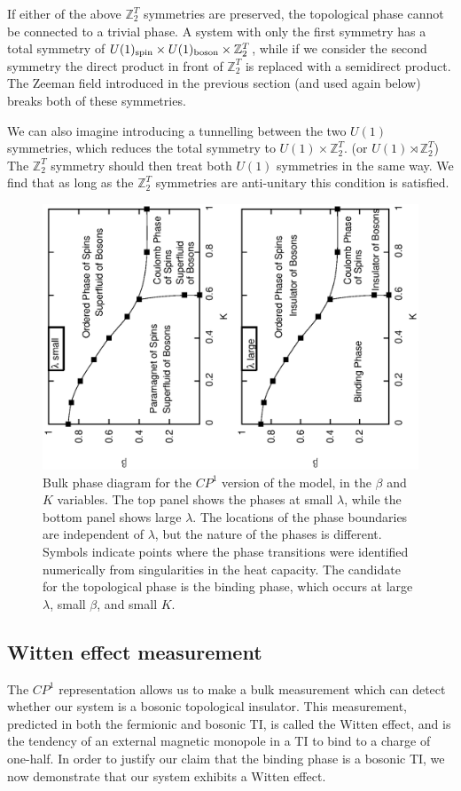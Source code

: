 \documentclass[prb,twocolumn]{revtex4-1}
\def\ztwot{\mathbb{Z}_2^T}
\newcommand{\cp}{$CP^1$ }
\begin{document}
If either of the above $\ztwot$ symmetries are preserved, the topological phase cannot be connected to a trivial phase. A system with only the first symmetry has a total symmetry of $U(1)_{\rm spin}\times U(1)_{\rm boson}\times \ztwot$, while if we consider the second symmetry the direct product in front of $\ztwot$ is replaced with a semidirect product. The Zeeman field introduced in the previous section (and used again below) breaks both of these symmetries.

We can also imagine introducing a tunnelling between the two $U(1)$ symmetries, which reduces the total symmetry to $U(1)\times\ztwot$. (or $U(1)\rtimes\ztwot$) The $\ztwot$ symmetry should then treat both $U(1)$ symmetries in the same way. We find that as long as the $\ztwot$ symmetries are anti-unitary this condition is satisfied.

\begin{figure}
\includegraphics[angle=-90,width=0.9\linewidth]{figures/cp1bulkphase.eps}
\caption{Bulk phase diagram for the $CP^1$ version of the model, in the $\beta$ and $K$ variables. The top panel shows the phases at small $\lambda$, while the bottom panel shows large $\lambda$. The locations of the phase boundaries are independent of $\lambda$, but the nature of the phases is different. Symbols indicate points where the phase transitions were identified numerically from singularities in the heat capacity. The candidate for the topological phase is the binding phase, which occurs at large $\lambda$, small $\beta$, and small $K$. }
\label{cp1bulkphase}
\end{figure}

\subsection{Witten effect measurement}
The \cp representation allows us to make a bulk measurement which can detect whether our system is a bosonic topological insulator. This measurement, predicted in both the fermionic\cite{FranzWitten} and bosonic\cite{MaxWitten} TI, is called the Witten effect, and is the tendency of an external magnetic monopole in a TI to bind to a charge of one-half. 
In order to justify our claim that the binding phase is a bosonic TI, we now demonstrate that our system exhibits a Witten effect. 
\end{document}
